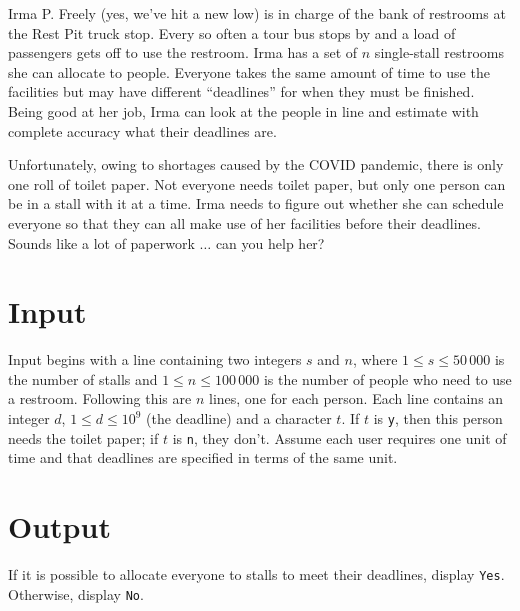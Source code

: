 
Irma P. Freely (yes, we've hit a new low) is in charge of the bank of
restrooms at the Rest Pit truck stop.  Every so often a tour bus stops by and a load of passengers gets off to use the restroom.  Irma has a set of $n$ single-stall restrooms she can allocate to people.  Everyone takes the same amount of time to use the facilities but may have different ``deadlines'' for when they must be finished.  Being good at her job, Irma can look at the people in line and estimate with complete accuracy what their deadlines are.

Unfortunately, owing to shortages caused by the COVID pandemic, there is only one roll of toilet paper. Not everyone needs toilet paper, but only one person can be in a stall with it at a time. Irma needs to figure out whether she can schedule everyone so that they can all make use of her facilities before their deadlines. Sounds like a lot of paperwork $\ldots$ can you help her?

\section*{Input}
Input begins with a line containing two integers $s$ and $n$,
where $1 \leq s \leq 50\,000$ is the number of stalls and $1 \leq n \leq 100\,000$ is the number of people who need to use a restroom.
Following this are $n$ lines, one for each person. Each line contains
an integer $d$, $1 \leq d \leq 10^9$ (the deadline) and a character $t$.  If $t$ is {\tt y}, then this person needs the toilet paper; if $t$ is {\tt n}, they don't. Assume each user requires one unit of time and that deadlines are specified in terms of the same unit.

\section*{Output}
If it is possible to allocate everyone to stalls to meet their deadlines, display {\tt Yes}.  Otherwise, display {\tt No}.
